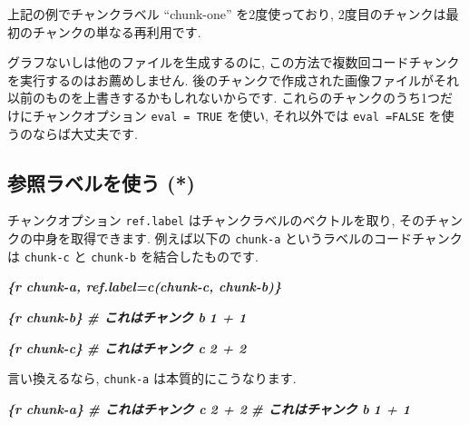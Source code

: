 \documentclass[
  11pt,
  lualatex,ja=standard,jafont=noto]{bxjsreport}
\newenvironment{Shaded}{\begin{snugshade}}{\end{snugshade}}
\newcommand{\InformationTok}[1]{\textcolor[rgb]{0.56,0.35,0.01}{\textbf{\textit{#1}}}}
\begin{document}
上記の例でチャンクラベル ``chunk-one'' を2度使っており, 2度目のチャンクは最初のチャンクの単なる再利用です.

グラフないしは他のファイルを生成するのに, この方法で複数回コードチャンクを実行するのはお薦めしません. 後のチャンクで作成された画像ファイルがそれ以前のものを上書きするかもしれないからです. これらのチャンクのうち1つだけにチャンクオプション \texttt{eval = TRUE} を使い, それ以外では \texttt{eval =FALSE} を使うのならば大丈夫です.

\hypertarget{ref-label}{%
\subsection{参照ラベルを使う (*)}\label{ref-label}}

チャンクオプション \texttt{ref.label} はチャンクラベルのベクトルを取り, そのチャンクの中身を取得できます. 例えば以下の \texttt{chunk-a} というラベルのコードチャンクは \texttt{chunk-c} と \texttt{chunk-b} を結合したものです.

\begin{Shaded}
\begin{Highlighting}[]
\InformationTok{\textasciigrave{}\textasciigrave{}\textasciigrave{}\{r chunk{-}a, ref.label=c(\textquotesingle{}chunk{-}c\textquotesingle{}, \textquotesingle{}chunk{-}b\textquotesingle{})\}}
\InformationTok{\textasciigrave{}\textasciigrave{}\textasciigrave{}}

\InformationTok{\textasciigrave{}\textasciigrave{}\textasciigrave{}\{r chunk{-}b\}}
\InformationTok{\# これはチャンク b}
\InformationTok{1 + 1}
\InformationTok{\textasciigrave{}\textasciigrave{}\textasciigrave{}}

\InformationTok{\textasciigrave{}\textasciigrave{}\textasciigrave{}\{r chunk{-}c\}}
\InformationTok{\# これはチャンク c}
\InformationTok{2 + 2}
\InformationTok{\textasciigrave{}\textasciigrave{}\textasciigrave{}}
\end{Highlighting}
\end{Shaded}

言い換えるなら, \texttt{chunk-a} は本質的にこうなります.

\begin{Shaded}
\begin{Highlighting}[]
\InformationTok{\textasciigrave{}\textasciigrave{}\textasciigrave{}\{r chunk{-}a\}}
\InformationTok{\# これはチャンク c}
\InformationTok{2 + 2}
\InformationTok{\# これはチャンク b}
\InformationTok{1 + 1}
\InformationTok{\textasciigrave{}\textasciigrave{}\textasciigrave{}}
\end{Highlighting}
\end{Shaded}
\end{document}
